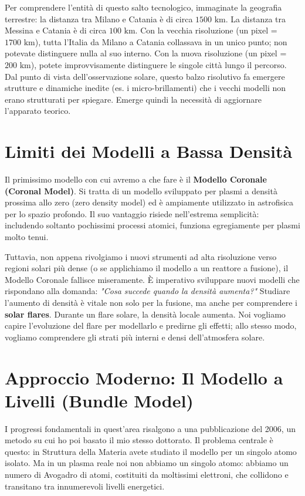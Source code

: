    Per comprendere l'entità di questo salto tecnologico, immaginate la geografia terrestre: la distanza tra Milano e Catania è di circa $1500\text{ km}$. La distanza tra Messina e Catania è di circa $100\text{ km}$.
    Con la vecchia risoluzione (un pixel = $1700\text{ km}$), tutta l'Italia da Milano a Catania collassava in un unico punto; non potevate distinguere nulla al suo interno. Con la nuova risoluzione (un pixel = $200\text{ km}$), potete improvvisamente distinguere le singole città lungo il percorso.
    Dal punto di vista dell'osservazione solare, questo balzo risolutivo fa emergere strutture e dinamiche inedite (es. i micro-brillamenti) che i vecchi modelli non erano strutturati per spiegare. Emerge quindi la necessità di aggiornare l'apparato teorico.

\section{Limiti dei Modelli a Bassa Densità}

Il primissimo modello con cui avremo a che fare è il \textbf{Modello Coronale (Coronal Model)}. Si tratta di un modello sviluppato per plasmi a densità prossima allo zero (zero density model) ed è ampiamente utilizzato in astrofisica per lo spazio profondo. Il suo vantaggio risiede nell'estrema semplicità: includendo soltanto pochissimi processi atomici, funziona egregiamente per plasmi molto tenui.

Tuttavia, non appena rivolgiamo i nuovi strumenti ad alta risoluzione verso regioni solari più dense (o se applichiamo il modello a un reattore a fusione), il Modello Coronale fallisce miseramente. È imperativo sviluppare nuovi modelli che rispondano alla domanda: \textit{"Cosa succede quando la densità aumenta?"}
Studiare l'aumento di densità è vitale non solo per la fusione, ma anche per comprendere i \textbf{solar flares}. Durante un flare solare, la densità locale aumenta. Noi vogliamo capire l'evoluzione del flare per modellarlo e predirne gli effetti; allo stesso modo, vogliamo comprendere gli strati più interni e densi dell'atmosfera solare.

\section{Approccio Moderno: Il Modello a Livelli (Bundle Model)}

I progressi fondamentali in quest'area risalgono a una pubblicazione del 2006, un metodo su cui ho poi basato il mio stesso dottorato.
Il problema centrale è questo: in Struttura della Materia avete studiato il modello per un singolo atomo isolato. Ma in un plasma reale noi non abbiamo un singolo atomo: abbiamo un numero di Avogadro di atomi, costituiti da moltissimi elettroni, che collidono e transitano tra innumerevoli livelli energetici.

